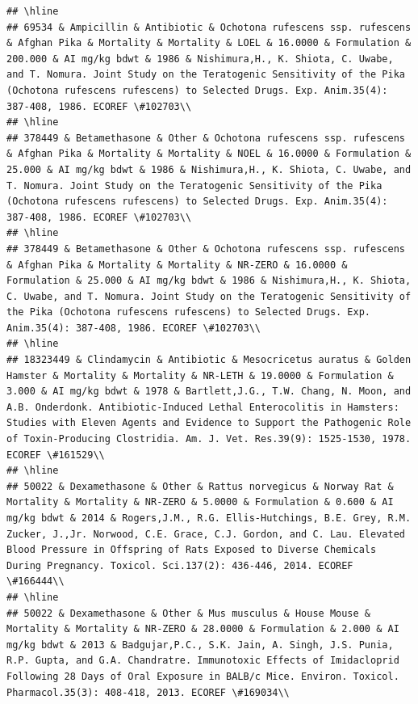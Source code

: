\documentclass[12pt,]{article}
\begin{document}
\begin{verbatim}
## \hline
## 69534 & Ampicillin & Antibiotic & Ochotona rufescens ssp. rufescens & Afghan Pika & Mortality & Mortality & LOEL & 16.0000 & Formulation & 200.000 & AI mg/kg bdwt & 1986 & Nishimura,H., K. Shiota, C. Uwabe, and T. Nomura. Joint Study on the Teratogenic Sensitivity of the Pika (Ochotona rufescens rufescens) to Selected Drugs. Exp. Anim.35(4): 387-408, 1986. ECOREF \#102703\\
## \hline
## 378449 & Betamethasone & Other & Ochotona rufescens ssp. rufescens & Afghan Pika & Mortality & Mortality & NOEL & 16.0000 & Formulation & 25.000 & AI mg/kg bdwt & 1986 & Nishimura,H., K. Shiota, C. Uwabe, and T. Nomura. Joint Study on the Teratogenic Sensitivity of the Pika (Ochotona rufescens rufescens) to Selected Drugs. Exp. Anim.35(4): 387-408, 1986. ECOREF \#102703\\
## \hline
## 378449 & Betamethasone & Other & Ochotona rufescens ssp. rufescens & Afghan Pika & Mortality & Mortality & NR-ZERO & 16.0000 & Formulation & 25.000 & AI mg/kg bdwt & 1986 & Nishimura,H., K. Shiota, C. Uwabe, and T. Nomura. Joint Study on the Teratogenic Sensitivity of the Pika (Ochotona rufescens rufescens) to Selected Drugs. Exp. Anim.35(4): 387-408, 1986. ECOREF \#102703\\
## \hline
## 18323449 & Clindamycin & Antibiotic & Mesocricetus auratus & Golden Hamster & Mortality & Mortality & NR-LETH & 19.0000 & Formulation & 3.000 & AI mg/kg bdwt & 1978 & Bartlett,J.G., T.W. Chang, N. Moon, and A.B. Onderdonk. Antibiotic-Induced Lethal Enterocolitis in Hamsters: Studies with Eleven Agents and Evidence to Support the Pathogenic Role of Toxin-Producing Clostridia. Am. J. Vet. Res.39(9): 1525-1530, 1978. ECOREF \#161529\\
## \hline
## 50022 & Dexamethasone & Other & Rattus norvegicus & Norway Rat & Mortality & Mortality & NR-ZERO & 5.0000 & Formulation & 0.600 & AI mg/kg bdwt & 2014 & Rogers,J.M., R.G. Ellis-Hutchings, B.E. Grey, R.M. Zucker, J.,Jr. Norwood, C.E. Grace, C.J. Gordon, and C. Lau. Elevated Blood Pressure in Offspring of Rats Exposed to Diverse Chemicals During Pregnancy. Toxicol. Sci.137(2): 436-446, 2014. ECOREF \#166444\\
## \hline
## 50022 & Dexamethasone & Other & Mus musculus & House Mouse & Mortality & Mortality & NR-ZERO & 28.0000 & Formulation & 2.000 & AI mg/kg bdwt & 2013 & Badgujar,P.C., S.K. Jain, A. Singh, J.S. Punia, R.P. Gupta, and G.A. Chandratre. Immunotoxic Effects of Imidacloprid Following 28 Days of Oral Exposure in BALB/c Mice. Environ. Toxicol. Pharmacol.35(3): 408-418, 2013. ECOREF \#169034\\

\end{verbatim}
\end{document}
